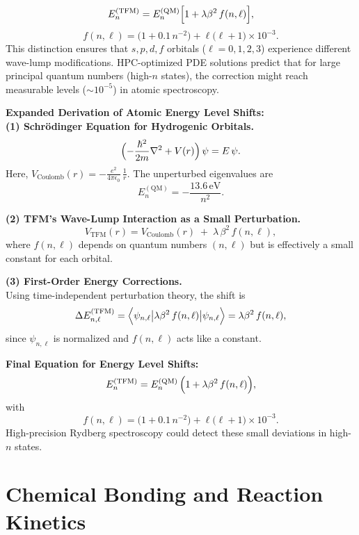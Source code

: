\documentclass[12pt]{article}
\begin{document}
\begin{equation}
  E_n^{(\mathrm{TFM})}
  =
  E_n^{(\mathrm{QM})}
  \Bigl[
    1 + \lambda\beta^2\,f(n,\ell)
  \Bigr],
  \label{eq:TFMHydroRefined}
\end{equation}
\begin{equation}
  f(n,\ell)
  =
  \bigl(1 + 0.1\,n^{-2}\bigr)
  +\ell\bigl(\ell + 1\bigr)\times 10^{-3}.
\end{equation}
This distinction ensures that $s,p,d,f$ orbitals (\(\ell=0,1,2,3\)) experience different wave-lump modifications. HPC-optimized PDE solutions predict that for large principal quantum numbers (high-$n$ states), the correction might reach measurable levels (\(\sim10^{-5}\)) in atomic spectroscopy.

\bigskip
\noindent
\textbf{Expanded Derivation of Atomic Energy Level Shifts:}\\[5pt]
\textbf{(1) Schr\"odinger Equation for Hydrogenic Orbitals.}\\
\[
\Bigl(-\frac{\hbar^2}{2m}\nabla^2 + V(r)\Bigr)\,\psi 
=
E\,\psi.
\]
Here, $V_{\mathrm{Coulomb}}(r)=-\tfrac{e^2}{4\pi\epsilon_0}\,\tfrac{1}{r}$. The unperturbed eigenvalues are
\[
E_n^{(\mathrm{QM})}
=
-\frac{13.6\,\mathrm{eV}}{n^2}.
\]

\noindent
\textbf{(2) TFM’s Wave-Lump Interaction as a Small Perturbation.}\\
\[
V_{\mathrm{TFM}}(r)
=
V_{\mathrm{Coulomb}}(r)
\;+\;
\lambda\,\beta^2\,f(n,\ell),
\]
where $f(n,\ell)$ depends on quantum numbers $(n,\ell)$ but is effectively a small constant for each orbital.

\noindent
\textbf{(3) First-Order Energy Corrections.}\\
Using time-independent perturbation theory, the shift is
\[
\Delta E_{n,\ell}^{(\mathrm{TFM})}
=
\Bigl\langle \psi_{n,\ell} \bigl|\lambda\beta^2\,f(n,\ell)\bigr|\psi_{n,\ell}\Bigr\rangle
=
\lambda\beta^2\,f(n,\ell),
\]
since $\psi_{n,\ell}$ is normalized and $f(n,\ell)$ acts like a constant.

\noindent
\textbf{Final Equation for Energy Level Shifts:}
\[
E_n^{(\mathrm{TFM})}
=
E_n^{(\mathrm{QM})}
\,\Bigl(1 + \lambda\beta^2\,f(n,\ell)\Bigr),
\]
with
\[
f(n,\ell)
=
\bigl(1+0.1\,n^{-2}\bigr)
+
\ell\bigl(\ell+1\bigr)\times 10^{-3}.
\]
High-precision Rydberg spectroscopy could detect these small deviations in high-$n$ states.

\section{Chemical Bonding and Reaction Kinetics}
\label{sec:ChemBondKinetics}
\end{document}
